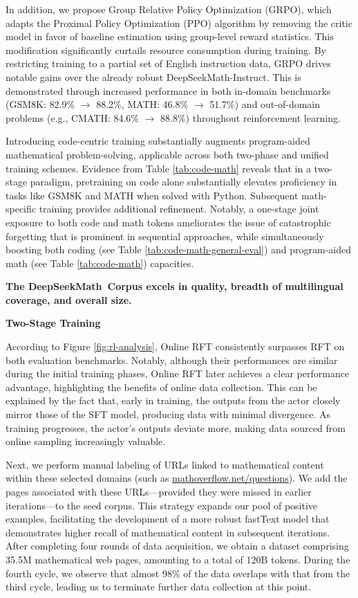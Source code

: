 \begin{itemize}[topsep=0pt]
In addition, we propose Group Relative Policy Optimization (GRPO), which adapts the Proximal Policy Optimization (PPO) algorithm \citep{schulman2017proximal} by removing the critic model in favor of baseline estimation using group-level reward statistics. This modification significantly curtails resource consumption during training. By restricting training to a partial set of English instruction data, GRPO drives notable gains over the already robust DeepSeekMath-Instruct. This is demonstrated through increased performance in both in-domain benchmarks (GSM8K: 82.9\% $\rightarrow$ 88.2\%, MATH: 46.8\% $\rightarrow$ 51.7\%) and out-of-domain problems (e.g., CMATH: 84.6\% $\rightarrow$ 88.8\%) throughout reinforcement learning.

Introducing code-centric training substantially augments program-aided mathematical problem-solving, applicable across both two-phase and unified training schemes. Evidence from Table \ref{tab:code-math} reveals that in a two-stage paradigm, pretraining on code alone substantially elevates proficiency in tasks like GSM8K and MATH when solved with Python. Subsequent math-specific training provides additional refinement. Notably, a one-stage joint exposure to both code and math tokens ameliorates the issue of catastrophic forgetting that is prominent in sequential approaches, while simultaneously boosting both coding (see Table \ref{tab:code-math-general-eval}) and program-aided math (see Table \ref{tab:code-math}) capacities.

\textbf{The DeepSeekMath~Corpus excels in quality, breadth of multilingual coverage, and overall size.}

\textbf{Two-Stage Training}

According to Figure \ref{fig:rl-analysis}, Online RFT consistently surpasses RFT on both evaluation benchmarks. Notably, although their performances are similar during the initial training phases, Online RFT later achieves a clear performance advantage, highlighting the benefits of online data collection. This can be explained by the fact that, early in training, the outputs from the actor closely mirror those of the SFT model, producing data with minimal divergence. As training progresses, the actor's outputs deviate more, making data sourced from online sampling increasingly valuable.

Next, we perform manual labeling of URLs linked to mathematical content within these selected domains (such as \url{mathoverflow.net/questions}). We add the pages associated with these URLs—provided they were missed in earlier iterations—to the seed corpus. This strategy expands our pool of positive examples, facilitating the development of a more robust fastText model that demonstrates higher recall of mathematical content in subsequent iterations. After completing four rounds of data acquisition, we obtain a dataset comprising 35.5M mathematical web pages, amounting to a total of 120B tokens. During the fourth cycle, we observe that almost 98\% of the data overlaps with that from the third cycle, leading us to terminate further data collection at this point.


\end{itemize}
